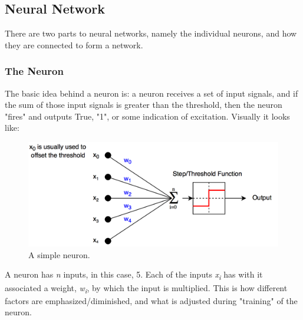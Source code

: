 \documentclass[a4paper, 12pt]{article}
\begin{document}
                \newpage
                
                \subsection{Neural Network}
                
                    \par There are two parts to neural networks, namely the individual neurons, and how they are connected to form a network.
                    
                    \subsubsection{The Neuron}
                    
                        \par The basic idea behind a neuron is: a neuron receives a set of input signals, and if the sum of those input signals is greater than the threshold, then the neuron "fires" and outputs True, "1", or some indication of excitation. Visually it looks like:
                        
                        \begin{figure}[h]
                            \caption{A simple neuron.}
                            \centering
                            \includegraphics[width=\textwidth]{neuron}
                        \end{figure}
                    
                        \par A neuron has \textit{n} inputs, in this case, 5. Each of the inputs \textit{x\textsubscript{i}} has with it associated a weight, \textit{w\textsubscript{i}}, by which the input is multiplied. This is how different factors are emphasized/diminished, and what is adjusted during "training" of the neuron.
                        
\end{document}
